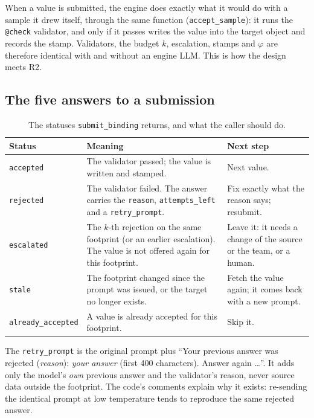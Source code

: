 \documentclass[10pt,a4paper]{article}
\newcommand{\code}[1]{\texttt{#1}}
\newcommand{\mcptool}[1]{\texttt{#1}}
\begin{document}
When a value is submitted, the engine does exactly what it would do with a
sample it drew itself, through the same function (\code{accept\_sample}): it
runs the \code{@check} validator, and only if it passes writes the value into
the target object and records the stamp. Validators, the budget $k$,
escalation, stamps and $\varphi$ are therefore identical with and without an
engine LLM. This is how the design meets R2.

\subsection{The five answers to a submission}

\begin{table}[!htb]
\centering\small
\caption{The statuses \mcptool{submit\_binding} returns, and what the caller should do.}
\label{tab:status-submit}
\begin{tabularx}{\textwidth}{@{}l Y Y@{}}
\toprule
Status & Meaning & Next step \\
\midrule
\code{accepted} & The validator passed; the value is written and stamped. & Next value. \\
\code{rejected} & The validator failed. The answer carries the \code{reason}, \code{attempts\_left} and a \code{retry\_prompt}. & Fix exactly what the reason says; resubmit. \\
\code{escalated} & The $k$-th rejection on the same footprint (or an earlier escalation). The value is not offered again for this footprint. & Leave it: it needs a change of the source or the team, or a human. \\
\code{stale} & The footprint changed since the prompt was issued, or the target no longer exists. & Fetch the value again; it comes back with a new prompt. \\
\code{already\_accepted} & A value is already accepted for this footprint. & Skip it. \\
\bottomrule
\end{tabularx}
\end{table}

The \code{retry\_prompt} is the original prompt plus ``Your previous answer
was rejected (\emph{reason}): \emph{your answer} (first 400 characters).
Answer again \ldots''. It adds only the model's \emph{own} previous answer and
the validator's reason, never source data outside the footprint. The code's
comments explain why it exists: re-sending the identical prompt at low
temperature tends to reproduce the same rejected answer.
\end{document}
